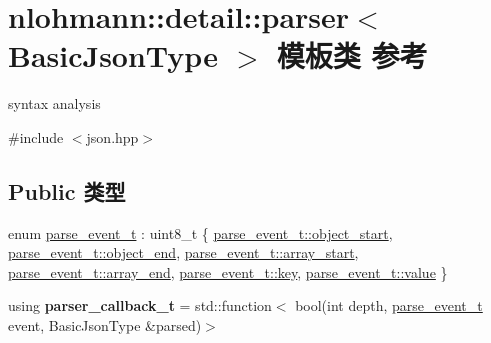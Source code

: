 \hypertarget{classnlohmann_1_1detail_1_1parser}{}\section{nlohmann\+::detail\+::parser$<$ Basic\+Json\+Type $>$ 模板类 参考}
\label{classnlohmann_1_1detail_1_1parser}


syntax analysis  




{\ttfamily \#include $<$json.\+hpp$>$}

\subsection*{Public 类型}
\begin{DoxyCompactItemize}
\item 
enum \mbox{\hyperlink{classnlohmann_1_1detail_1_1parser_a37ac88c864dda495f72cb62776b0bebe}{parse\+\_\+event\+\_\+t}} \+: uint8\+\_\+t \{ \newline
\mbox{\hyperlink{classnlohmann_1_1detail_1_1parser_a37ac88c864dda495f72cb62776b0bebeae73f17027cb0acbb537f29d0a6944b26}{parse\+\_\+event\+\_\+t\+::object\+\_\+start}}, 
\mbox{\hyperlink{classnlohmann_1_1detail_1_1parser_a37ac88c864dda495f72cb62776b0bebeaf63e2a2468a37aa4f394fcc3bcb8249c}{parse\+\_\+event\+\_\+t\+::object\+\_\+end}}, 
\mbox{\hyperlink{classnlohmann_1_1detail_1_1parser_a37ac88c864dda495f72cb62776b0bebeaa4388a3d92419edbb1c6efd4d52461f3}{parse\+\_\+event\+\_\+t\+::array\+\_\+start}}, 
\mbox{\hyperlink{classnlohmann_1_1detail_1_1parser_a37ac88c864dda495f72cb62776b0bebea49642fb732aa2e112188fba1f9d3ef7f}{parse\+\_\+event\+\_\+t\+::array\+\_\+end}}, 
\newline
\mbox{\hyperlink{classnlohmann_1_1detail_1_1parser_a37ac88c864dda495f72cb62776b0bebea3c6e0b8a9c15224a8228b9a98ca1531d}{parse\+\_\+event\+\_\+t\+::key}}, 
\mbox{\hyperlink{classnlohmann_1_1detail_1_1parser_a37ac88c864dda495f72cb62776b0bebea2063c1608d6e0baf80249c42e2be5804}{parse\+\_\+event\+\_\+t\+::value}}
 \}
\item 
\mbox{\label{classnlohmann_1_1detail_1_1parser_ad250ad4f2b4af4a497e727c963162ff1}} 
using {\bfseries parser\+\_\+callback\+\_\+t} = std\+::function$<$ bool(int depth, \mbox{\hyperlink{classnlohmann_1_1detail_1_1parser_a37ac88c864dda495f72cb62776b0bebe}{parse\+\_\+event\+\_\+t}} event, Basic\+Json\+Type \&parsed)$>$
\end{DoxyCompactItemize}
